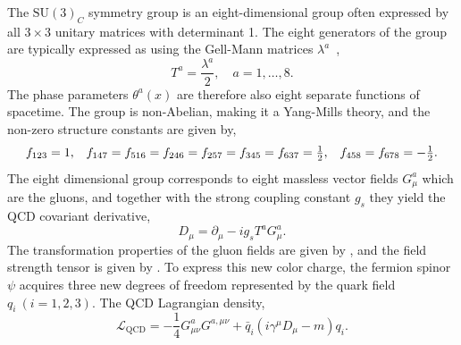 The $\text{SU}(3)_C$ symmetry group is an eight-dimensional group often expressed by all $3 \times 3$ unitary matrices with determinant 1.
The eight generators of the group are typically expressed as using the Gell-Mann matrices $\lambda^a$~\cite{GellManMatrix},
\begin{equation}
	\label{eq:su3_generators}
	T^a = \frac{\lambda^a}{2}, \quad a = 1, \ldots, 8.
\end{equation}
The phase parameters $\theta^a(x)$ are therefore also eight separate functions of spacetime.
The group is non-Abelian, making it a Yang-Mills theory, and the non-zero structure constants are given by,
\begin{equation}
	\label{eq:qcd_sc}
	\begin{array}{ccc}
		f_{123} = 1 ,                                                            & \hspace{\stretch{1}}
		f_{147} = f_{516} = f_{246} = f_{257} = f_{345} = f_{637} = \frac{1}{2}, & \hspace{\stretch{1}}
		f_{458} = f_{678} = -\frac{1}{2}.
	\end{array}
\end{equation}
The eight dimensional group corresponds to eight massless vector fields $G_\mu^a$ which are the gluons, and together with the strong coupling constant $g_s$ they yield the QCD covariant derivative,
\begin{equation}
	\label{eq:qcd_covariant_derivative}
	D_\mu = \partial_\mu - i g_s T^a G_\mu^a.
\end{equation}
The transformation properties of the gluon fields are given by , and the field strength tensor is given by .
To express this new color charge, the fermion spinor $\psi$ acquires three new degrees of freedom represented by the quark field $q_i\:(i = 1, 2, 3)$.
The QCD Lagrangian density,
\begin{equation}
	\label{eq:qcd_lagrangian}
	\mathcal{L}_\text{QCD} = -\frac{1}{4} G_{\mu\nu}^a G^{a,\mu\nu} + \bar q_i (i \gamma^\mu D_\mu - m) q_i.
\end{equation}

